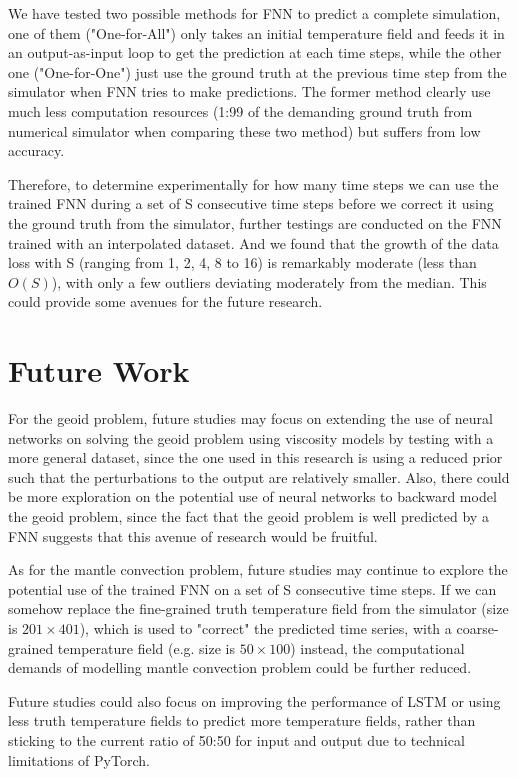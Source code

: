 We have tested two possible methods for FNN to predict a complete simulation, one of them ("One-for-All") only takes an initial temperature field and feeds it in an output-as-input loop to get the prediction at each time steps, while the other one ("One-for-One") just use the ground truth at the previous time step from the simulator when FNN tries to make predictions. The former method clearly use much less computation resources (1:99 of the demanding ground truth from numerical simulator when comparing these two method) but suffers from low accuracy.

Therefore, to determine experimentally for how many time steps we can use the trained FNN during a set of S consecutive time steps before we correct it using the ground truth from the simulator, further testings are conducted on the FNN trained with an interpolated dataset. And we found that the growth of the data loss with S (ranging from 1, 2, 4, 8 to 16) is remarkably moderate (less than $O(S)$), with only a few outliers deviating moderately from the median. This could provide some avenues for the future research.

\section{Future Work}

For the geoid problem, future studies may focus on extending the use of neural networks on solving the geoid problem using viscosity models by testing with a more general dataset, since the one used in this research is using a reduced prior such that the perturbations to the output are relatively smaller. Also, there could be more exploration on the potential use of neural networks to backward model the geoid problem, since the fact that the geoid problem is well predicted by a FNN suggests that this avenue of research would be fruitful.

As for the mantle convection problem, future studies may continue to explore the potential use of the trained FNN on a set of S consecutive time steps. If we can somehow replace the fine-grained truth temperature field from the simulator (size is $201 \times 401$), which is used to "correct" the predicted time series, with a coarse-grained temperature field (e.g. size is $50 \times 100$) instead, the computational demands of modelling mantle convection problem could be further reduced.

Future studies could also focus on improving the performance of LSTM or using less truth temperature fields to predict more temperature fields, rather than sticking to the current ratio of 50:50 for input and output due to technical limitations of PyTorch.

